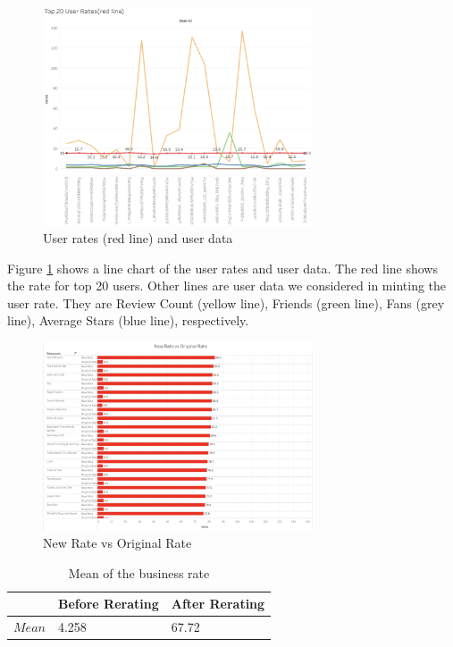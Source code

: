 \documentclass{stylefiles/capstone}
\begin{document}
\begin{figure}[htp]
    \centering
    \includegraphics[width=8cm]{asset/result_1.png}
    \caption{User rates (red line) and user data}
    \label{line_chart_figure}
\end{figure}

Figure \ref{line_chart_figure} shows a line chart of the user rates and user data.
The red line shows the rate for top 20 users. Other lines are user data we considered in minting the user rate. They are Review Count (yellow line), Friends (green line), Fans (grey line), Average Stars (blue line), respectively.

\begin{figure}[htp]
    \centering
    \includegraphics[width=8cm]{asset/result_2.png}
    \caption{New Rate vs Original Rate}
    \label{rate_comparasion_figure}
\end{figure}

\begin{table}[h!]
\centering
\begin{tabular}{l l l} 
 \hline
 & Before Rerating & After Rerating  \\ [0.5ex] 
 \hline
$ Mean $ & 4.258& 67.72  \\
 \hline
\end{tabular}
\caption{Mean of the business rate}

\label{mean}
\end{table}
\end{document}
